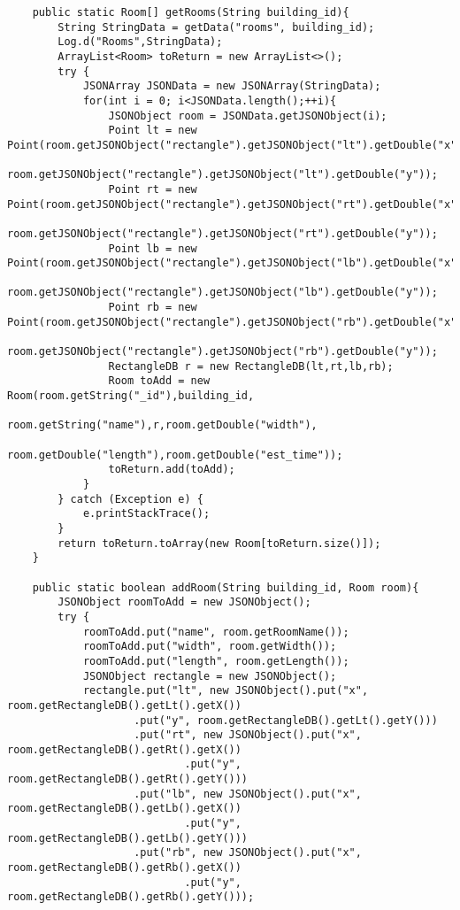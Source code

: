 \begin{lstlisting}
    public static Room[] getRooms(String building_id){
        String StringData = getData("rooms", building_id);
        Log.d("Rooms",StringData);
        ArrayList<Room> toReturn = new ArrayList<>();
        try {
            JSONArray JSONData = new JSONArray(StringData);
            for(int i = 0; i<JSONData.length();++i){
                JSONObject room = JSONData.getJSONObject(i);
                Point lt = new Point(room.getJSONObject("rectangle").getJSONObject("lt").getDouble("x"),
                                     room.getJSONObject("rectangle").getJSONObject("lt").getDouble("y"));
                Point rt = new Point(room.getJSONObject("rectangle").getJSONObject("rt").getDouble("x"),
                                     room.getJSONObject("rectangle").getJSONObject("rt").getDouble("y"));
                Point lb = new Point(room.getJSONObject("rectangle").getJSONObject("lb").getDouble("x"),
                                     room.getJSONObject("rectangle").getJSONObject("lb").getDouble("y"));
                Point rb = new Point(room.getJSONObject("rectangle").getJSONObject("rb").getDouble("x"),
                                     room.getJSONObject("rectangle").getJSONObject("rb").getDouble("y"));
                RectangleDB r = new RectangleDB(lt,rt,lb,rb);
                Room toAdd = new Room(room.getString("_id"),building_id,
                        room.getString("name"),r,room.getDouble("width"),
                        room.getDouble("length"),room.getDouble("est_time"));
                toReturn.add(toAdd);
            }
        } catch (Exception e) {
            e.printStackTrace();
        }
        return toReturn.toArray(new Room[toReturn.size()]);
    }

    public static boolean addRoom(String building_id, Room room){
        JSONObject roomToAdd = new JSONObject();
        try {
            roomToAdd.put("name", room.getRoomName());
            roomToAdd.put("width", room.getWidth());
            roomToAdd.put("length", room.getLength());
            JSONObject rectangle = new JSONObject();
            rectangle.put("lt", new JSONObject().put("x", room.getRectangleDB().getLt().getX())
                    .put("y", room.getRectangleDB().getLt().getY()))
                    .put("rt", new JSONObject().put("x", room.getRectangleDB().getRt().getX())
                            .put("y", room.getRectangleDB().getRt().getY()))
                    .put("lb", new JSONObject().put("x", room.getRectangleDB().getLb().getX())
                            .put("y", room.getRectangleDB().getLb().getY()))
                    .put("rb", new JSONObject().put("x", room.getRectangleDB().getRb().getX())
                            .put("y", room.getRectangleDB().getRb().getY()));


\end{lstlisting}

